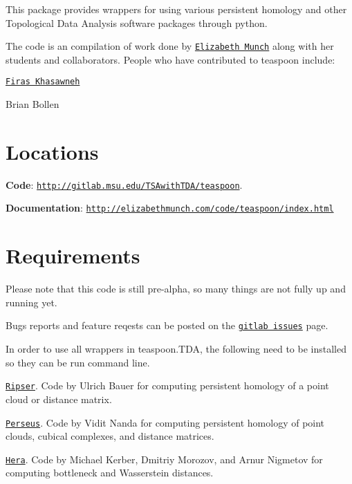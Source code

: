 This package provides wrappers for using various persistent homology and other Topological Data Analysis software packages through python.

The code is an compilation of work done by \href{http://www.elizabethmunch.com}{\tt Elizabeth Munch} along with her students and collaborators. People who have contributed to teaspoon include\+:


\begin{DoxyItemize}
\item \href{http://www.firaskhasawneh.com}{\tt Firas Khasawneh}
\item Brian Bollen
\end{DoxyItemize}

\section*{Locations }


\begin{DoxyItemize}
\item {\bfseries Code}\+: \href{https://gitlab.msu.edu/TSAwithTDA/teaspoon}{\tt http\+://gitlab.\+msu.\+edu/\+T\+S\+Awith\+T\+D\+A/teaspoon}.
\item {\bfseries Documentation}\+: \href{http://elizabethmunch.com/code/teaspoon/index.html}{\tt http\+://elizabethmunch.\+com/code/teaspoon/index.\+html}
\end{DoxyItemize}

\section*{Requirements }

Please note that this code is still pre-\/alpha, so many things are not fully up and running yet.

Bugs reports and feature reqests can be posted on the \href{https://gitlab.msu.edu/TSAwithTDA/teaspoon/issues}{\tt gitlab issues} page.

In order to use all wrappers in teaspoon.\+T\+DA, the following need to be installed so they can be run command line.


\begin{DoxyItemize}
\item \href{https://github.com/Ripser/ripser}{\tt Ripser}. Code by Ulrich Bauer for computing persistent homology of a point cloud or distance matrix.
\item \href{http://people.maths.ox.ac.uk/nanda/perseus/index.html}{\tt Perseus}. Code by Vidit Nanda for computing persistent homology of point clouds, cubical complexes, and distance matrices.
\item \href{https://bitbucket.org/grey_narn/hera}{\tt Hera}. Code by Michael Kerber, Dmitriy Morozov, and Arnur Nigmetov for computing bottleneck and Wasserstein distances.
\end{DoxyItemize}


